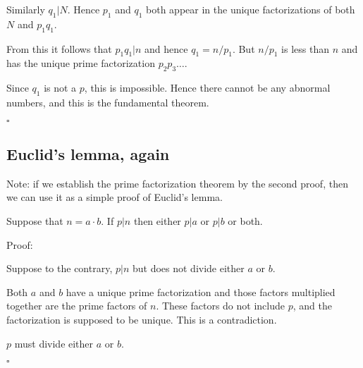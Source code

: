 \documentclass[11pt, oneside]{article}
\begin{document}
Similarly $q_1 | N$.  Hence $p_1$ and $q_1$ both appear in the unique factorizations of both $N$ and $p_1 q_1$.

From this it follows that $p_1 q_1 | n$ and hence $q_1 = n/p_1$.  But $n/p_1$ is less than $n$ and has the unique prime factorization $p_2 p_3 \dots$.

Since $q_1$ is not a $p$, this is impossible.  Hence there cannot be any abnormal numbers, and this is the fundamental theorem.

$\square$

\subsection*{Euclid's lemma, again}

Note:  if we establish the prime factorization theorem by the second proof, then we can use it as a simple proof of Euclid's lemma.  

Suppose that $n=a \cdot b$.  If  $p | n$ then either $p | a$ or $p | b$ or both.

Proof:

Suppose to the contrary, $p | n$ but does not divide either $a$ or $b$.

Both $a$ and $b$ have a unique prime factorization and those factors multiplied together are the prime factors of $n$.  These factors do not include $p$, and the factorization is supposed to be unique.  This is a contradiction.

$p$ must divide either $a$ or $b$.

$\square$
\end{document}
